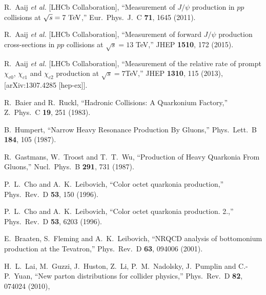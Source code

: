 \documentclass[12pt,a4paper,final]{iopart}
\begin{document}
\begin{thebibliography}{100}
  R.~Aaij {\it et al.} [LHCb Collaboration],
  ``Measurement of $J/\psi$ production in $pp$ collisions at $\sqrt{s}=7~\rm{TeV}$,''
  Eur.\ Phys.\ J.\ C {\bf 71}, 1645 (2011).

  R.~Aaij {\it et al.} [LHCb Collaboration],
  ``Measurement of forward $J/\psi$ production cross-sections in $pp$ collisions at $\sqrt{s}=13$ TeV,''
  JHEP {\bf 1510}, 172 (2015).




  R.~Aaij {\it et al.} [LHCb Collaboration],
  ``Measurement of the relative rate of prompt $\chi_{c0}$, $\chi_{c1}$ and $\chi_{c2}$ production at $\sqrt{s}=7$TeV,''
  JHEP {\bf 1310}, 115 (2013), [arXiv:1307.4285 [hep-ex]].
 




  R.~Baier and R.~Ruckl,
  ``Hadronic Collisions: A Quarkonium Factory,''
  Z.\ Phys.\ C {\bf 19}, 251 (1983).


  B.~Humpert,
  ``Narrow Heavy Resonance Production By Gluons,''
  Phys.\ Lett.\ B {\bf 184}, 105 (1987).


  R.~Gastmans, W.~Troost and T.~T.~Wu,
  ``Production of Heavy Quarkonia From Gluons,''
  Nucl.\ Phys.\ B {\bf 291}, 731 (1987).


  P.~L.~Cho and A.~K.~Leibovich,
  ``Color octet quarkonia production,''
  Phys.\ Rev.\ D {\bf 53}, 150 (1996).


  P.~L.~Cho and A.~K.~Leibovich,
  ``Color octet quarkonia production. 2.,''
  Phys.\ Rev.\ D {\bf 53}, 6203 (1996).


  E.~Braaten, S.~Fleming and A.~K.~Leibovich,
  ``NRQCD analysis of bottomonium production at the Tevatron,''
  Phys.\ Rev.\ D {\bf 63}, 094006 (2001).


  H.~L.~Lai, M.~Guzzi, J.~Huston, Z.~Li, P.~M.~Nadolsky, J.~Pumplin and C.-P.~Yuan,
  ``New parton distributions for collider physics,''
  Phys.\ Rev.\ D {\bf 82}, 074024 (2010),



\end{thebibliography}
\end{document}
